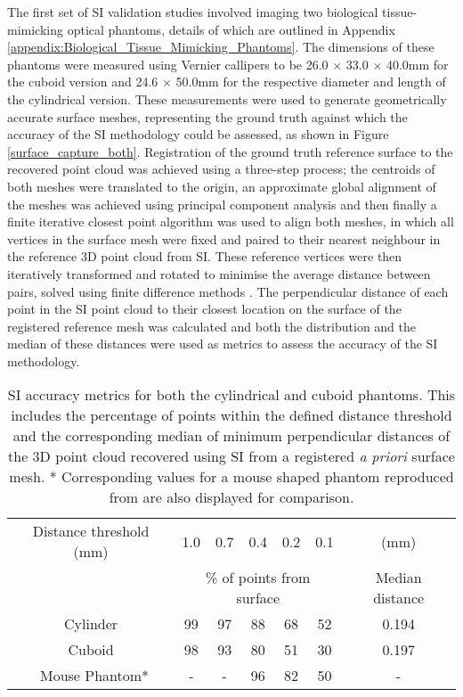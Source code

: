 \documentclass[twoside]{bhamthesis}
\theoremstyle{definition}
\begin{document}
The first set of SI validation studies involved imaging two biological tissue-mimicking optical phantoms, details of which are outlined in Appendix \ref{appendix:Biological_Tissue_Mimicking_Phantoms}. The dimensions of these phantoms were measured using Vernier callipers to be 26.0 $\times$ 33.0 $\times$ 40.0mm for the cuboid version and 24.6 $\times$ 50.0mm for the respective diameter and length of the cylindrical version. These measurements were used to generate geometrically accurate surface meshes, representing the ground truth against which the accuracy of the SI methodology could be assessed, as shown in Figure \ref{surface_capture_both}. Registration of the ground truth reference surface to the recovered point cloud was achieved using a three-step process; the centroids of both meshes were translated to the origin, an approximate global alignment of the meshes was achieved using principal component analysis and then finally a finite iterative closest point algorithm was used to align both meshes, in which all vertices in the surface mesh were fixed and paired to their nearest neighbour in the reference 3D point cloud from SI. These reference vertices were then iteratively transformed and rotated to minimise the average distance between pairs, solved using finite difference methods \cite{chen1992object}. The perpendicular distance of each point in the SI point cloud to their closest location on the surface of the registered reference mesh was calculated and both the distribution and the median of these distances were used as metrics to assess the accuracy of the SI methodology.
 
\bgroup
\def\arraystretch{1.2}
\begin{table}[!ht]
\small
\begin{center}
 \begin{tabular}{c | c c c c c | c} 
 \hline
Distance threshold (mm) & 1.0 & 0.7 & 0.4 & 0.2 & 0.1 & (mm) \\ 
 & \multicolumn{5}{c|}{\% of points from surface} & Median distance \\  
 \hline
Cylinder & 99 & 97 & 88 & 68 & 52 & 0.194 \\ 
Cuboid & 98 & 93 & 80 & 51 & 30 & 0.197\\\ 
Mouse Phantom* & - & - & 96 & 82 & 50 & - \\
 \hline
\end{tabular}
\caption{SI accuracy metrics for both the cylindrical and cuboid phantoms. This includes the percentage of points within the defined distance threshold and the corresponding median of minimum perpendicular distances of the 3D point cloud recovered using SI from a registered \textit{a priori} surface mesh. * Corresponding values for a mouse shaped phantom reproduced from \cite{basevi2013simultaneous} are also displayed for comparison. }
\label{tab:Surface_capture_error_table}
\end{center}
\end{table}
\egroup
\end{document}
